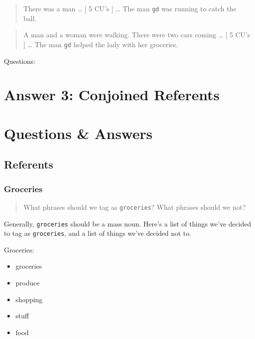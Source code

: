 \documentclass[
]{book}
\providecommand{\tightlist}{%
  \setlength{\itemsep}{0pt}\setlength{\parskip}{0pt}}
\begin{document}
\begin{quote}
There was a man \ldots{}
{[} 5 CU's {]} \ldots{}
The man \texttt{gd} was running to catch the ball.
\end{quote}

\begin{quote}
A man and a woman were walking.
There were two cars coming \ldots{}
{[} 5 CU's {]} \ldots{}
The man \texttt{gd} helped the lady with her groceries.
\end{quote}

Questions:

\hypertarget{answer-3-conjoined-referents}{%
\chapter{Answer 3: Conjoined Referents}\label{answer-3-conjoined-referents}}

\hypertarget{questions-answers}{%
\chapter{Questions \& Answers}\label{questions-answers}}

\hypertarget{referents-1}{%
\section{Referents}\label{referents-1}}

\hypertarget{groceries-1}{%
\subsection{Groceries}\label{groceries-1}}

\begin{quote}
What phrases should we tag as \texttt{groceries}? What phrases should we not?
\end{quote}

Generally, \texttt{groceries} should be a mass noun.
Here's a list of things we've decided to tag as \texttt{groceries}, and a list of things we've decided not to.

Groceries:

\begin{itemize}
\tightlist
\item
  groceries
\item
  produce
\item
  shopping
\item
  stuff
\item
  food
\end{itemize}
\end{document}
